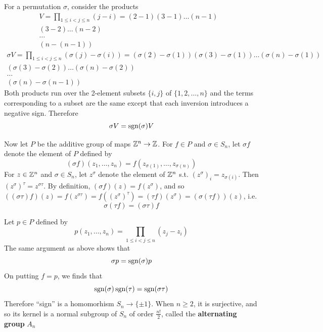 \documentclass[11pt]{article}
\begin{document}
For a permutation \(\sigma\), consider the products
\begin{align*}
V=\prod_{1\le i<j\le n}(j-i)=(2-1)(3-1)\dots(n-1)&\\
(3-2)\dots(n-2)&\\
\dots\quad&\\
(n-(n-1))&
\end{align*}
\begin{align*}
\sigma V=\prod_{1\le i<j\le n}(\sigma(j)-\sigma(i))=(\sigma(2)-\sigma(1))(\sigma(3)-\sigma(1))\dots(\sigma(n)-\sigma(1))&\\
(\sigma(3)-\sigma(2))\dots(\sigma(n)-\sigma(2))&\\
\dots\quad&\\
(\sigma(n)-\sigma(n-1))&
\end{align*}
Both products run over the 2-element subsets \(\{i,j\}\) of \(\{1,2,\dots,n\}\) and the terms
corresponding to a subset are the same except that each inversion introduces a negative sign.
Therefore
\begin{equation*}
\sigma V=\operatorname{sgn}(\sigma)V
\end{equation*}

Now let \(P\) be the additive group of maps \(\mathbb{Z}^n\to\mathbb{Z}\). For \(f\in P\) and \(\sigma\in S_n\), let \(\sigma f\)
denote the element of \(P\) defined by
\begin{equation*}
(\sigma f)(z_1,\dots,z_n)=f(z_{\sigma(1)},\dots,z_{\sigma(n)})
\end{equation*}
For \(z\in\mathbb{Z}^n\) and \(\sigma\in S_n\), let \(z^\sigma\) denote the element of \(\mathbb{Z}^n\) s.t. \((z^\sigma)_i=z_{\sigma(i)}\).
Then \((z^\sigma)^\tau=z^{\sigma\tau}\). By definition, \((\sigma f)(z)=f(z^\sigma)\), and
so \(((\sigma\tau)f)(z)=f(z^{\sigma\tau})=f((z^\sigma)^\tau)=(\tau f)(z^\sigma)=(\sigma(\tau f))(z)\), i.e.
\begin{equation*}
\sigma(\tau f)=(\sigma\tau)f
\end{equation*}

Let \(p\in P\) defined by
\begin{equation*}
p(z_1,\dots,z_n)=\prod_{1\le i<j\le n}(z_j-z_i)
\end{equation*}
The same argument as above shows that
\begin{equation*}
\sigma p=\operatorname{sgn}(\sigma)p
\end{equation*}
On putting \(f=p\), we finds that
\begin{equation*}
\operatorname{sgn}(\sigma)\operatorname{sgn}(\tau)=\operatorname{sgn}(\sigma\tau)
\end{equation*}
Therefore ``sign'' is a homomorhism \(S_n\to\{\pm 1\}\). When \(n\ge 2\), it is surjective, and so its
kernel is a normal subgroup of \(S_n\) of order \(\frac{n!}{2}\), called the \textbf{alternating
group} \(A_n\)
\end{document}
